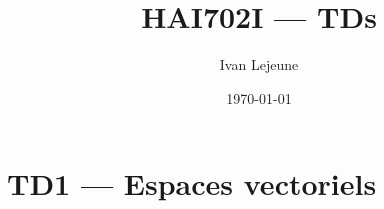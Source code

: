 \documentclass[french,a4paper,10pt]{article}
\title{\color{astral} \sffamily \bfseries HAI702I --- TDs}
\author{Ivan Lejeune}
\date{\today}
\begin{document}
    \maketitle
    \tableofcontents

    \newpage
    \section*{TD1 --- Espaces vectoriels}\label{sec:TD1}
    \setcounter{section}{1}
    \setcounter{tdcounter}{0}
    

% 
\end{document}

